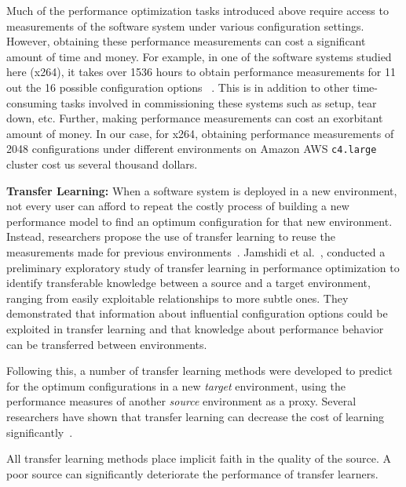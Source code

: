 \documentclass[10pt,journal,compsoc]{IEEEtran}
\begin{document}
Much of the performance optimization tasks introduced above require access to measurements of the software system under various configuration settings. 
However, obtaining these performance measurements can cost a significant amount
of time and money. For example, in one of the software systems studied here ({\sc x264}), it takes over 1536 hours to obtain performance measurements for 11 out the 16 possible configuration options ~\cite{valov2017transferring}. This is in addition to other time-consuming tasks involved in commissioning these systems such as setup, 
tear down, etc. Further, making performance measurements can cost an exorbitant amount of money. In our case, for {\sc x264}, obtaining
performance measurements of 2048 configurations under different 
environments on Amazon AWS \texttt{c4.large} cluster cost us several thousand 
dollars.

\noindent\textbf{Transfer Learning: }
When a software system is deployed in a new environment, not every user can 
afford to repeat the costly process of building a new performance model to find 
an optimum configuration for that new environment. Instead, researchers propose 
the use of  transfer learning to 
reuse the measurements made for previous 
environments~\cite{valov2017transferring, jamshidi2017transfer, 
chen2011experience,golovin2017google}.
Jamshidi et al.~\cite{jamshidi2017transfer}, conducted a preliminary exploratory study of transfer learning in performance optimization to identify transferable knowledge between a source and a target environment, ranging from easily exploitable relationships to more subtle ones. 
They demonstrated that information about influential configuration options could 
be exploited in transfer learning and that knowledge about performance
behavior can be transferred between environments.

Following this, a number of transfer learning methods were developed to predict 
for the optimum configurations in a new \textit{target} environment, using the 
performance measures of another \textit{source} environment as a proxy. Several 
researchers have shown that transfer 
learning can decrease the cost of learning 
significantly~\cite{jamshidi2017transfer2,    valov2017transferring, 
jamshidi2017transfer,chen2011experience}.

All transfer learning methods place implicit faith in the quality of the source. A poor source can significantly deteriorate the performance of transfer learners. 
\end{document}
